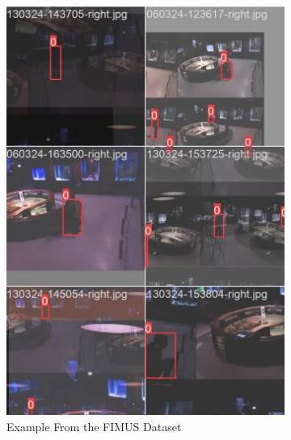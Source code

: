 \begin{figure}[H]
    \centering
    \begin{subfigure}{0.49\textwidth}
        \centering
        \includegraphics[width=\textwidth]{Images/mosaic.jpg}
        \caption{\centering Example From the FIMUS Dataset}
    \end{subfigure}
    \hfill
    \begin{subfigure}{0.49\textwidth}
        \centering

\end{subfigure}
\end{figure}
